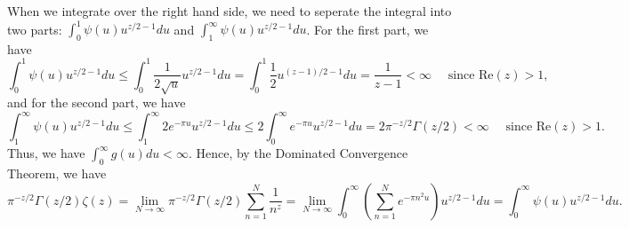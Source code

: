 \documentclass{elegantbook}
\begin{document}
\begin{problemset}[Exercises]
\begin{solution}
\begin{enumerate}[(a)]
      When we integrate over the right hand side, we need to seperate the integral into two parts: $\int_{0}^{1} \psi(u) u^{z/2 - 1} du$ and $\int_{1}^{\infty} \psi(u) u^{z/2 - 1} du$. For the first part, we have
      \[
        \int_{0}^{1} \psi(u) u^{z/2 - 1} du \leq \int_{0}^{1} \frac{1}{2\sqrt{u}} u^{z/2 - 1} du = \int_{0}^{1} \frac{1}{2} u^{(z-1)/2 - 1} du = \frac{1}{z-1} < \infty \quad \text{ since } \mathrm{Re}(z) > 1,
      \]
      and for the second part, we have
      \[
        \int_{1}^{\infty} \psi(u) u^{z/2 - 1} du \leq \int_{1}^{\infty} 2e^{-\pi u} u^{z/2 - 1} du \leq 2\int_0^{\infty} e^{-\pi u} u^{z/2 - 1} du = 2\pi^{-z/2} \Gamma(z/2) < \infty \quad \text{ since } \mathrm{Re}(z) > 1.
      \]
      Thus, we have $\int_{0}^{\infty} g(u) du < \infty$. Hence, by the Dominated Convergence Theorem, we have
      \[
        \pi^{-z/2}\Gamma(z/2) \zeta(z) = \lim_{N\to\infty} \pi^{-z/2}\Gamma(z/2) \sum_{n=1}^{N} \frac{1}{n^z} = \lim_{N\to\infty} \int_{0}^{\infty} \left( \sum_{n=1}^{N} e^{-\pi n^2 u } \right) u^{z/2 - 1} du = \int_{0}^{\infty} \psi(u) u^{z/2 - 1} du.
      \]
    \end{enumerate}
  \end{solution}
\end{problemset}
\end{document}
